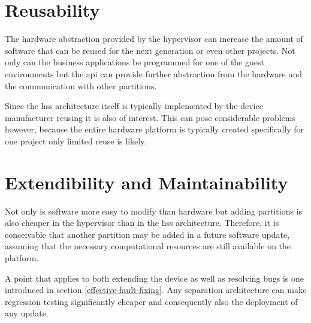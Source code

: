 
\section{Reusability}
The hardware abstraction provided by the hypervisor can increase the amount of software that can be reused for the next generation or even other projects. Not only can the business applications be programmed for one of the guest environments but the \acrshort{api} can provide further abstraction from the hardware and the communication with other partitions.

Since the \acrshort{hss} architecture itself is typically implemented by the device manufacturer reusing it is also of interest. This can pose considerable problems however, because the entire hardware platform is typically created specifically for one project only limited reuse is likely.


\section{Extendibility and Maintainability}
Not only is software more easy to modify than hardware but adding partitions is also cheaper in the hypervisor than in the \acrshort{hss} architecture. Therefore, it is conceivable that another partition may be added in a future software update, assuming that the necessary computational resources are still available on the platform. 

A point that applies to both extending the device as well as resolving bugs is one introduced in section \ref{effective-fault-fixing}. Any separation architecture can make regression testing significantly cheaper and consequently also the deployment of any update. 


